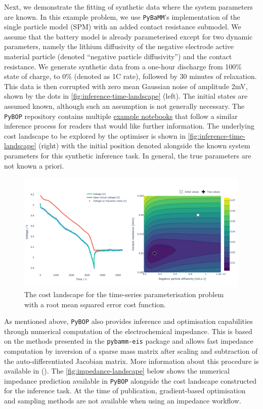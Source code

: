 \documentclass[
]{article}
\begin{document}
Next, we demonstrate the fitting of synthetic data where the system
parameters are known. In this example problem, we use \texttt{PyBaMM}'s
implementation of the single particle model (SPM) with an added contact
resistance submodel. We assume that the battery model is already
parameterised except for two dynamic parameters, namely the lithium
diffusivity of the negative electrode active material particle (denoted
``negative particle diffusivity'') and the contact resistance. We
generate synthetic data from a one-hour discharge from 100\% state of
charge, to 0\% (denoted as 1C rate), followed by 30 minutes of
relaxation. This data is then corrupted with zero mean Gaussian noise of
amplitude 2mV, shown by the dots in
\autoref{fig:inference-time-landscape} (left). The initial states are
assumed known, although such an assumption is not generally necessary.
The \texttt{PyBOP} repository contains multiple
\href{https://github.com/pybop-team/PyBOP/tree/develop/examples/notebooks}{example
notebooks} that follow a similar inference process for readers that
would like further information. The underlying cost landscape to be
explored by the optimiser is shown in
\autoref{fig:inference-time-landscape} (right) with the initial position
denoted alongside the known system parameters for this synthetic
inference task. In general, the true parameters are not known a priori.

\begin{figure}
\centering
\includegraphics[width=1\textwidth,height=\textheight]{figures/joss/sim-landscape.png}
\caption{The cost landscape for the time-series parameterisation problem
with a root mean squared error cost function.
\label{fig:inference-time-landscape}}
\end{figure}

As mentioned above, \texttt{PyBOP} also provides inference and
optimisation capabilities through numerical computation of the
electrochemical impedance. This is based on the methods presented in the
\texttt{pybamm-eis} package and allows fast impedance computation by
inversion of a sparse mass matrix after scaling and subtraction of the
auto-differentiated Jacobian matrix. More information about this
procedure is available in (). The \autoref{fig:impedance-landscape} below shows the numerical
impedance prediction available in \texttt{PyBOP} alongside the cost
landscape constructed for the inference task. At the time of
publication, gradient-based optimisation and sampling methods are not
available when using an impedance workflow.
\end{document}
